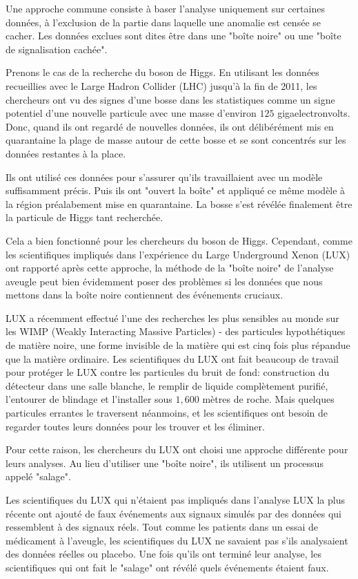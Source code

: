 	Une approche commune consiste à baser l'analyse uniquement sur certaines données, à l'exclusion de la partie dans laquelle une anomalie est censée se cacher. Les données exclues sont dites être dans une "boîte noire" ou une "boîte de signalisation cachée".

	Prenons le cas de la recherche du boson de Higgs. En utilisant les données recueillies avec le Large Hadron Collider (LHC) jusqu'à la fin de 2011, les chercheurs ont vu des signes d'une bosse dans les statistiques comme un signe potentiel d'une nouvelle particule avec une masse d'environ $ 125 $ gigaelectronvolts. Donc, quand ils ont regardé de nouvelles données, ils ont délibérément mis en quarantaine la plage de masse autour de cette bosse et se sont concentrés sur les données restantes à la place.
	
	Ils ont utilisé ces données pour s'assurer qu'ils travaillaient avec un modèle suffisamment précis. Puis ils ont "ouvert la boîte" et appliqué ce même modèle à la région préalabement mise en quarantaine. La bosse s'est révélée finalement être la particule de Higgs tant recherchée.

	Cela a bien fonctionné pour les chercheurs du boson de Higgs. Cependant, comme les scientifiques impliqués dans l'expérience du Large Underground Xenon (LUX) ont rapporté après cette approche, la méthode de la "boîte noire" de l'analyse aveugle peut bien évidemment poser des problèmes si les données que nous mettons dans la boîte noire contiennent des événements cruciaux.
	
	LUX a récemment effectué l'une des recherches les plus sensibles au monde sur les WIMP (Weakly Interacting Massive Particles) - des particules hypothétiques de matière noire, une forme invisible de la matière qui est cinq fois plus répandue que la matière ordinaire. Les scientifiques du LUX ont fait beaucoup de travail pour protéger le LUX contre les particules du bruit de fond: construction du détecteur dans une salle blanche, le remplir de liquide complètement purifié, l'entourer de blindage et l'installer sous $1,600$ mètres de roche. Mais quelques particules errantes le traversent néanmoins, et les scientifiques ont besoin de regarder toutes leurs données pour les trouver et les éliminer.

	Pour cette raison, les chercheurs du LUX ont choisi une approche différente pour leurs analyses. Au lieu d'utiliser une "boîte noire", ils utilisent un processus appelé "salage".

	Les scientifiques du LUX qui n'étaient pas impliqués dans l'analyse LUX la plus récente ont ajouté de faux événements aux signaux simulés par des données qui ressemblent à des signaux réels. Tout comme les patients dans un essai de médicament à l'aveugle, les scientifiques du LUX ne savaient pas s'ils analysaient des données réelles ou placebo. Une fois qu'ils ont terminé leur analyse, les scientifiques qui ont fait le "salage" ont révélé quels événements étaient faux.

